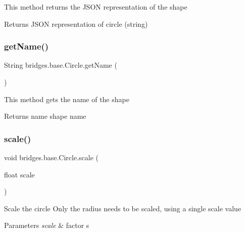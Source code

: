 This method returns the J\+S\+ON representation of the shape

\begin{DoxyReturn}{Returns}
J\+S\+ON representation of circle (string) 
\end{DoxyReturn}
\mbox{\label{classbridges_1_1base_1_1_circle_a3782ea68f0419747c00bd8b2bfa31462}} 
\subsubsection{\texorpdfstring{get\+Name()}{getName()}}
{\footnotesize\ttfamily String bridges.\+base.\+Circle.\+get\+Name (\begin{DoxyParamCaption}{ }\end{DoxyParamCaption})}

This method gets the name of the shape

\begin{DoxyReturn}{Returns}
name shape name 
\end{DoxyReturn}
\mbox{\label{classbridges_1_1base_1_1_circle_acbb48177b6e99326294cd90f74b58a27}} 
\subsubsection{\texorpdfstring{scale()}{scale()}}
{\footnotesize\ttfamily void bridges.\+base.\+Circle.\+scale (\begin{DoxyParamCaption}\item[{float}]{scale }\end{DoxyParamCaption})}

Scale the circle Only the radius needs to be scaled, using a single scale value


\begin{DoxyParams}{Parameters}
{\em scale} & factor s \\
\hline
\end{DoxyParams}
\mbox{\label{classbridges_1_1base_1_1_circle_ac11cce75c482bb5c5751dfd1d5353b44}} 
